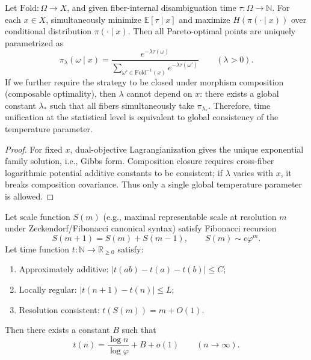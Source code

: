 \begin{theorem}\label{thm:xi-time-entropy-pareto-gibbs-global-temperature}
Let \(\mathrm{Fold}:\Omega\to X\), and given fiber-internal disambiguation time \(\tau:\Omega\to\mathbb N\).
For each \(x\in X\), simultaneously minimize \(\mathbb E[\tau\mid x]\) and maximize \(H(\pi(\cdot\mid x))\) over conditional distribution \(\pi(\cdot\mid x)\).
Then all Pareto-optimal points are uniquely parametrized as
\[
\pi_\lambda(\omega\mid x)
=
\frac{e^{-\lambda\tau(\omega)}}{\sum_{\omega'\in \mathrm{Fold}^{-1}(x)}e^{-\lambda\tau(\omega')}}\qquad(\lambda>0).
\]
If we further require the strategy to be closed under morphism composition (composable optimality), then \(\lambda\) cannot depend on \(x\): there exists a global constant \(\lambda_\ast\) such that all fibers simultaneously take \(\pi_{\lambda_\ast}\).
Therefore, time unification at the statistical level is equivalent to global consistency of the temperature parameter.
\end{theorem}

\begin{proof}
For fixed \(x\), dual-objective Lagrangianization gives the unique exponential family solution, i.e., Gibbs form.
Composition closure requires cross-fiber logarithmic potential additive constants to be consistent; if \(\lambda\) varies with \(x\), it breaks composition covariance.
Thus only a single global temperature parameter is allowed.
\end{proof}

\begin{theorem}\label{thm:xi-logphi-time-rigidity}
Let scale function \(S(m)\) (e.g., maximal representable scale at resolution \(m\) under Zeckendorf/Fibonacci canonical syntax) satisfy Fibonacci recursion
\[
S(m+1)=S(m)+S(m-1),\qquad S(m)\sim c\varphi^m.
\]
Let time function \(t:\mathbb N\to\mathbb R_{\ge 0}\) satisfy:
\begin{enumerate}
  \item Approximately additive: \(|t(ab)-t(a)-t(b)|\le C\);
  \item Locally regular: \(|t(n+1)-t(n)|\le L\);
  \item Resolution consistent: \(t(S(m))=m+O(1)\).
\end{enumerate}
Then there exists a constant \(B\) such that
\[
t(n)=\frac{\log n}{\log\varphi}+B+o(1)\qquad(n\to\infty).
\]
\end{theorem}

